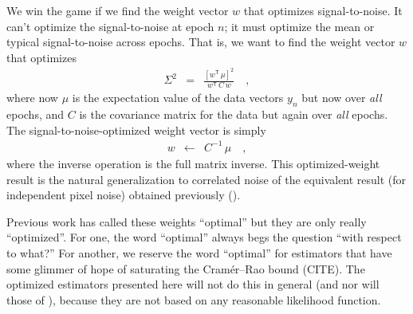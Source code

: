 \documentclass[12pt, letterpaper, preprint]{aastex}
\newcommand{\transpose}[1]{{#1}^{\!\mathsf T}}
\newcommand{\inverse}[1]{{#1}^{-1}}
\begin{document}
We win the game if we find the weight vector $w$ that optimizes signal-to-noise.
It can't optimize the signal-to-noise at epoch $n$;
  it must optimize the mean or typical signal-to-noise across epochs.
That is, we want to find the weight vector $w$ that optimizes
\begin{eqnarray}
  \Sigma^2 &=& \frac{[\transpose{w}\, \mu]^2}{\transpose{w}\, C\, w}
  \quad ,
\end{eqnarray}
where now $\mu$ is the expectation value of the data vectors $y_n$ but now over \emph{all} epochs,
  and $C$ is the covariance matrix for the data but again over \emph{all} epochs.
The signal-to-noise-optimized weight vector is simply
\begin{eqnarray}
  w &\leftarrow& \inverse{C}\, \mu
  \quad ,
\end{eqnarray}
  where the inverse operation is the full matrix inverse.
This optimized-weight result is the natural generalization to correlated noise
  of the equivalent result (for independent pixel noise)
  obtained previously (\citealt{naylor}).

Previous work has called these weights ``optimal'' but they are only really ``optimized''.
For one, the word ``optimal'' always begs the question ``with respect to what?''
For another, we reserve the word ``optimal'' for estimators
  that have some glimmer of hope of saturating the Cram\'er--Rao bound (CITE).
The optimized estimators presented here will not do this in general
  (and nor will those of \citealt{naylor}),
  because they are not based on any reasonable likelihood function.
\end{document}

